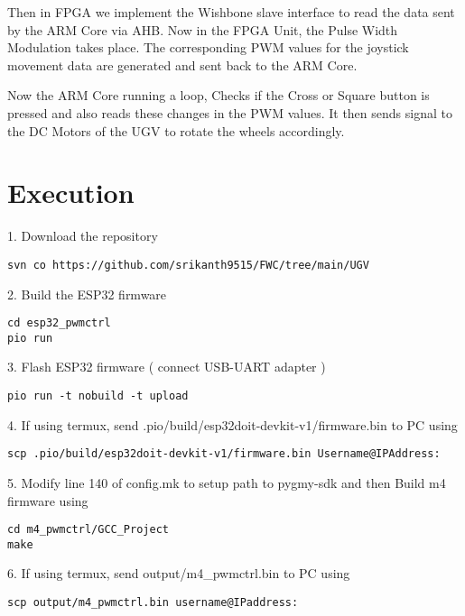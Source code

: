 \documentclass[journal,12pt,twocolumn]{IEEEtran}
\begin{document}
\vspace{0.25cm}

Then in FPGA we implement the Wishbone slave interface to read the data sent by the ARM Core via AHB. Now in the FPGA Unit, the Pulse Width Modulation takes place. The corresponding PWM values for the joystick movement data are generated and sent back to the ARM Core.\\

\vspace{0.25cm}

Now the ARM Core running a loop, Checks if the Cross or Square button is pressed and also reads these changes in the PWM values. It then sends signal to the DC Motors of the UGV to rotate the wheels accordingly.\\

\section{Execution}
\raggedright
1. Download the repository

\begin{lstlisting}
svn co https://github.com/srikanth9515/FWC/tree/main/UGV
\end{lstlisting}

2. Build the ESP32 firmware
\begin{lstlisting}
cd esp32_pwmctrl
pio run
\end{lstlisting} 

3. Flash ESP32 firmware ( connect USB-UART adapter )
\begin{lstlisting}
pio run -t nobuild -t upload
\end{lstlisting} 

4. If using termux, send .pio/build/esp32doit-devkit-v1/firmware.bin to PC using
\begin{lstlisting}
scp .pio/build/esp32doit-devkit-v1/firmware.bin Username@IPAddress:
\end{lstlisting} 

5.  Modify line 140 of config.mk to setup path to pygmy-sdk and then Build m4 firmware using
\begin{lstlisting}
cd m4_pwmctrl/GCC_Project
make
\end{lstlisting}

6. If using termux, send output/m4{\_}pwmctrl.bin to PC using
\begin{lstlisting}
scp output/m4_pwmctrl.bin username@IPaddress:
\end{lstlisting} 
\end{document}
